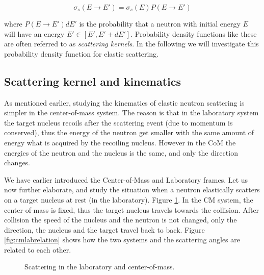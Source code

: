 $$\sigma_s(E\rightarrow E')=\sigma_s(E)P(E\rightarrow E')$$

\noindent where $P(E\rightarrow E')dE'$ is the probability that a neutron with initial energy $E$ will have an energy $E' \in [E',E'+dE']$. Probability density functions like these are often referred to as \textit{scattering kernels}. In the following we will investigate this probability density function for elastic scattering.

\subsection{Scattering kernel and kinematics}

As mentioned earlier, studying the kinematics of elastic neutron scattering is simpler in the center-of-mass system. The reason is that in the laboratory system the target nucleus recoils after the scattering event (due to momentum is conserved), thus the energy of the neutron get smaller with the same amount of energy what is acquired by the recoiling nucleus. However in the CoM the energies of the neutron and the nucleus is the same, and only the direction changes. 

We have earlier introduced the Center-of-Mass and Laboratory frames. Let us now further elaborate, and study the situation when a neutron elastically scatters on a target nucleus at rest (in the laboratory). Figure \ref{fig:cmlabscatter}. In the CM system, the center-of-mass is fixed, thus the target nucleus travels towards the collision. After collision the speed of the nucleus and the neutron is not changed, only the direction, the nucleus and the target travel back to back. Figure \ref{fig:cmlabrelation} shows how the two systems and the scattering angles are related to each other.

\begin{figure}[ht!]
\protect {}\protect
\caption{\label{fig:cmlabscatter} \footnotesize{Scattering in the laboratory and center-of-mass.}}
\end{figure}

